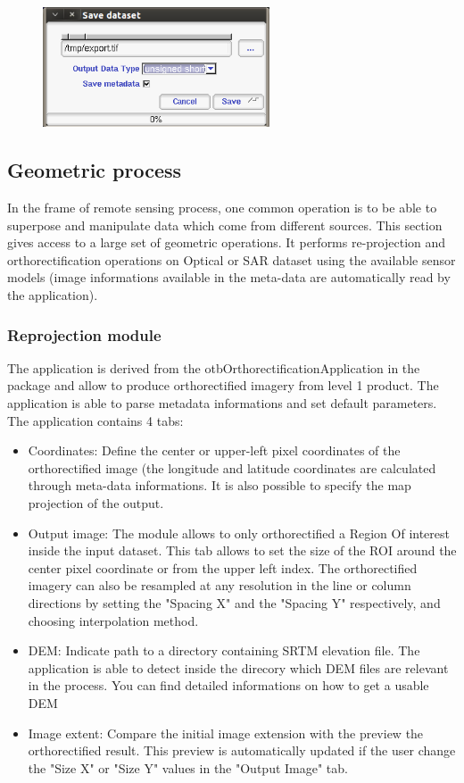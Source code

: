 \begin{figure}
  \center
  \includegraphics[width=0.6\textwidth]{../Art/MonteverdiImages/monteverdi_export_dataset.png}
  \label{fig:exportdataset}
\end{figure}

\subsection{Geometric process}
In the frame of remote sensing process, one common operation is to be
able to superpose and manipulate data which come from different
sources.  This section gives access to a large set of geometric
operations.  It performs re-projection and orthorectification
operations on Optical or SAR dataset using the available sensor models
(image informations available in the meta-data are automatically read
by the application).  
\subsubsection{Reprojection module}
The application is derived from the otbOrthorectificationApplication
in the \app package and allow to produce orthorectified imagery from
level 1 product. The application is able to parse metadata
informations and set default parameters. The application contains 4
tabs:

\begin{itemize}
\item Coordinates: Define the center or upper-left pixel coordinates
  of the orthorectified image (the longitude and latitude coordinates
  are calculated through meta-data informations. It is also possible
  to specify the map projection of the output.
\item Output image: The module allows to only orthorectified a Region
  Of interest inside the input dataset. This tab allows to set the size
  of the ROI around the center pixel coordinate or from the upper
  left index. The orthorectified imagery can also be resampled at any
  resolution in the line or column directions by setting the "Spacing
  X" and the "Spacing Y" respectively, and choosing interpolation method.
\item DEM: Indicate path to a directory containing SRTM elevation
  file. The application is able to detect inside the direcory which
  DEM files are relevant in the process. You can find detailed
  informations on how to get a usable DEM
\item Image extent: Compare the initial image extension with the
  preview the orthorectified result. This preview is automatically
  updated if the user change the "Size X" or "Size Y" values in the
  "Output Image" tab.
\end{itemize}


